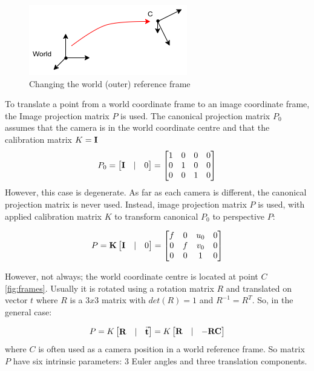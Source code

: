 \begin{figure}[h]
    \centering
    \includegraphics[width=.5\textwidth]{graphics/frames.png}
    \caption{Changing the world (outer) reference frame}
    \label{fig:frames}
\end{figure}
To translate a point from a world coordinate frame to an image coordinate frame, the Image projection matrix $P$ is used. 
The canonical projection matrix $P_0$ assumes that the camera is in the world coordinate centre and that the calibration matrix $K = \bf{I}$
$$
P_0 = \begin{bmatrix} \bf{I} & | & 0 \end{bmatrix} = 
    \begin{bmatrix}
    1 & 0 & 0 & 0 \\
    0 & 1 & 0 & 0 \\
    0 & 0 & 1 & 0 \\
    \end{bmatrix}
$$
However, this case is degenerate. 
As far as each camera is different, the canonical projection matrix is never used. Instead, image projection matrix $P$ is used, with applied calibration matrix $K$ to transform canonical $P_0$ to perspective $P$:

$$
P = \bf{K} \begin{bmatrix} \bf{I} & | & 0 \end{bmatrix} = 
    \begin{bmatrix} 
    f & 0 & u_0 & 0 \\
    0 & f & v_0 & 0 \\ 
    0 & 0 & 1 & 0 \\
    \end{bmatrix}
$$

However, not always; the world coordinate centre is located at point $C$ \autoref{fig:frames}. 
Usually it is rotated using a rotation matrix $R$ and translated on vector $t$ where $R$ is a $3x3$ matrix with $det(R) = 1$ and $R^{-1} = R^T$. 
So, in the general case:

$$
P =   K \begin{bmatrix} \bf{R} & | & \vec{\bf{t}} \end{bmatrix} = 
        K \begin{bmatrix} \bf{R} & | & - \bf{R} \bf{C} \end{bmatrix}
$$
where $C$ is often used as a camera position in a world reference frame. 
So matrix $P$ have six intrinsic parameters: 3 Euler angles and three translation components. 

